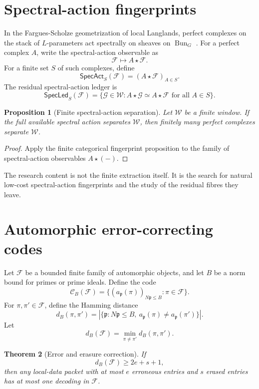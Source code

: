 \documentclass[11pt]{article}
\newtheorem{theorem}{Theorem}[section]
\newtheorem{proposition}[theorem]{Proposition}
\DeclareMathOperator{\Bun}{Bun}
\begin{document}
\section{Spectral-action fingerprints}

In the Fargues-Scholze geometrization of local Langlands, perfect complexes on the stack of \(L\)-parameters act spectrally on sheaves on \(\Bun_G\) \cite{farguesscholze}.  For a perfect complex \(A\), write the spectral-action observable as
\[
\mathcal F\longmapsto A\star\mathcal F.
\]
For a finite set \(S\) of such complexes, define
\[
\mathsf{SpecAct}_S(\mathcal F)=(A\star\mathcal F)_{A\in S}.
\]
The residual spectral-action ledger is
\[
\mathsf{SpecLed}_S(\mathcal F)=
\{\mathcal G\in\mathcal W:
A\star\mathcal G\simeq A\star\mathcal F
\text{ for all }A\in S\}.
\]

\begin{proposition}[Finite spectral-action separation]
Let \(\mathcal W\) be a finite window.  If the full available spectral action separates \(\mathcal W\), then finitely many perfect complexes separate \(\mathcal W\).
\end{proposition}

\begin{proof}
Apply the finite categorical fingerprint proposition to the family of spectral-action observables \(A\star(-)\).
\end{proof}

The research content is not the finite extraction itself.  It is the search for natural low-cost spectral-action fingerprints and the study of the residual fibres they leave.

\section{Automorphic error-correcting codes}

Let \(\mathcal F\) be a bounded finite family of automorphic objects, and let \(B\) be a norm bound for primes or prime ideals.  Define the code
\[
\mathcal C_B(\mathcal F)=
\{(a_{\mathfrak p}(\pi))_{N\mathfrak p\leq B}:\pi\in\mathcal F\}.
\]
For \(\pi,\pi'\in\mathcal F\), define the Hamming distance
\[
d_B(\pi,\pi')=
|\{\mathfrak p:N\mathfrak p\leq B,\ a_{\mathfrak p}(\pi)\neq a_{\mathfrak p}(\pi')\}|.
\]
Let
\[
d_B(\mathcal F)=\min_{\pi\neq\pi'}d_B(\pi,\pi').
\]

\begin{theorem}[Error and erasure correction]
If
\[
d_B(\mathcal F)\geq 2e+s+1,
\]
then any local-data packet with at most \(e\) erroneous entries and \(s\) erased entries has at most one decoding in \(\mathcal F\).
\end{theorem}
\end{document}
